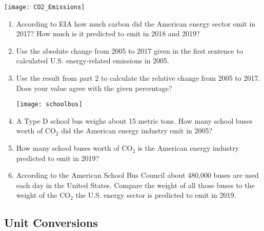 \begin{exercise}
  \texttt{[image: CO2\_Emissions]}
  \begin{enumerate}
  \item According to EIA how much carbon did the American energy
    sector emit in 2017? How much is it predicted to emit in 2018 and
    2019?


  \item Use the absolute change from 2005 to 2017 given in the first
    sentence to calculated U.S. energy-related emissions in 2005.


  \item Use the result from part 2 to calculate the relative change
    from 2005 to 2017. Does your value agree with the given
    percentage?


    \newpage

    \begin{center}
      \texttt{[image: schoolbus]}
    \end{center}
  \item A Type D school bus weighs about 15 metric tons. How many
    school buses worth of \(\text{CO}_2\) did the American energy
    industry emit in 2005?

  \item How many school buses worth of \(\text{CO}_2\) is the American
    energy industry predicted to emit in 2019?



  \item According to the American School Bus Council about 480,000
    buses are used each day in the United States. Compare the weight
    of all those buses to the weight of the \(\text{CO}_2\) the U.S.
    energy sector is predicted to emit in 2019.

  \end{enumerate}
\end{exercise}

\newpage

\subsection{Unit Conversions}%
\label{sub:unit-conversions}

